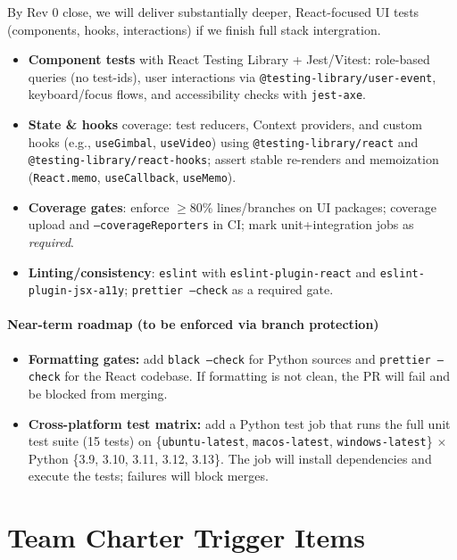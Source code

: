 \documentclass{article}
\begin{document}
By Rev 0 close, we will deliver substantially deeper, React-focused UI tests
(components, hooks, interactions) if we finish full stack intergration.
\begin{itemize}
  \item \textbf{Component tests} with React Testing Library + Jest/Vitest: role-based queries (no test-ids), user interactions via \texttt{@testing-library/user-event}, keyboard/focus flows, and accessibility checks with \texttt{jest-axe}.
  \item \textbf{State \& hooks} coverage: test reducers, Context providers, and custom hooks (e.g., \texttt{useGimbal}, \texttt{useVideo}) using \texttt{@testing-library/react} and \texttt{@testing-library/react-hooks}; assert stable re-renders and memoization (\texttt{React.memo}, \texttt{useCallback}, \texttt{useMemo}).
  \item \textbf{Coverage gates}: enforce \(\ge\)80\% lines/branches on UI packages; coverage upload and \texttt{--coverageReporters} in CI; mark unit+integration jobs as \emph{required}.
  \item \textbf{Linting/consistency}: \texttt{eslint} with \texttt{eslint-plugin-react} and \texttt{eslint-plugin-jsx-a11y}; \texttt{prettier --check} as a required gate.
\end{itemize}

\paragraph{Near-term roadmap (to be enforced via branch protection)}
\begin{itemize}
  \item \textbf{Formatting gates:} add \texttt{black --check} for Python sources and \texttt{prettier --check} for the React codebase. If formatting is not clean, the PR will fail and be blocked from merging.
  \item \textbf{Cross-platform test matrix:} add a Python test job that runs the full unit test suite (15 tests) on
        \{\texttt{ubuntu-latest}, \texttt{macos-latest}, \texttt{windows-latest}\} $\times$
        Python \{3.9, 3.10, 3.11, 3.12, 3.13\}. The job will install dependencies and execute the tests; failures will block merges.
\end{itemize}

\section{Team Charter Trigger Items}
\end{document}
